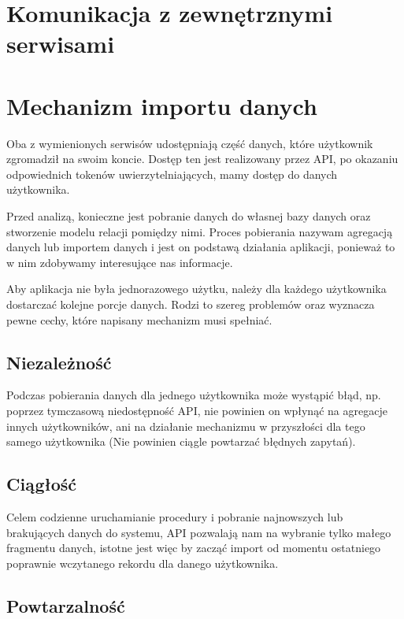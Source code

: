 \documentclass[brudnopis]{xmgr}
\begin{document}
        \section*{Komunikacja z zewnętrznymi serwisami}

    \section{Mechanizm importu danych}

        Oba z wymienionych serwisów udostępniają część danych, które użytkownik zgromadził na swoim koncie.
        Dostęp ten jest realizowany przez API, po okazaniu odpowiednich tokenów uwierzytelniających, mamy dostęp do danych użytkownika.

        Przed analizą, konieczne jest pobranie danych do własnej bazy danych oraz stworzenie modelu relacji pomiędzy nimi.
        Proces pobierania nazywam agregacją danych lub importem danych i jest on podstawą działania aplikacji,
        ponieważ to w nim zdobywamy interesujące nas informacje.

        Aby aplikacja nie była jednorazowego użytku, należy dla każdego użytkownika dostarczać kolejne porcje danych.
        Rodzi to szereg problemów oraz wyznacza pewne cechy, które napisany mechanizm musi spełniać.

        \subsection*{Niezależność}
        Podczas pobierania danych dla jednego użytkownika może wystąpić błąd, np. poprzez tymczasową niedostępność API,
        nie powinien on wpłynąć na agregacje innych użytkowników, ani na działanie mechanizmu w przyszłości dla tego samego użytkownika
        (Nie powinien ciągle powtarzać błędnych zapytań).

        \subsection*{Ciągłość}
        Celem codzienne uruchamianie procedury i pobranie najnowszych lub brakujących danych do systemu,
        API pozwalają nam na wybranie tylko małego fragmentu danych, istotne jest więc by zacząć import
        od momentu ostatniego poprawnie wczytanego rekordu dla danego użytkownika.

        \subsection*{Powtarzalność}
\end{document}
